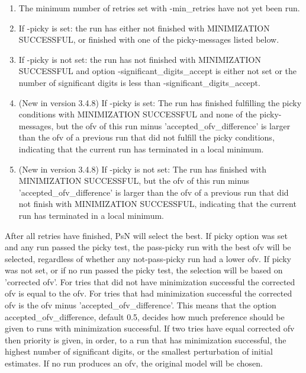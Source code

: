 \documentclass[a4paper,12pt]{article}
\begin{document}
\begin{enumerate}
\item The minimum number of retries set with -min\_retries have not yet been run.
\item If -picky is set: the run has either not finished with MINIMIZATION SUCCESSFUL, or finished with one of the picky-messages listed below.
\item If -picky is not set: the run has not finished with MINIMIZATION SUCCESSFUL and option -significant\_digits\_accept is either not set or the number of significant digits is less than -significant\_digits\_accept.
\item (New in version 3.4.8) If -picky is set: The run has finished fulfilling the picky conditions with MINIMIZATION SUCCESSFUL and none of the picky-messages, but the ofv of this run minus 'accepted\_ofv\_difference' is larger than the ofv of a previous run that did not fulfill the picky conditions, indicating that the current run has terminated in a local minimum.
\item (New in version 3.4.8) If -picky is not set: The run has finished with MINIMIZATION SUCCESSFUL, but the ofv of this run minus 'accepted\_ofv\_difference' is larger than the ofv of a previous run that did not finish with MINIMIZATION SUCCESSFUL, indicating that the current run has terminated in a local minimum.
\end{enumerate}

After all retries have finished, PsN will select the best. If picky option was set and any run passed the picky test, the pass-picky run with the best ofv will be selected, regardless of whether any not-pass-picky run had a lower ofv. If picky was not set, or if no run passed the picky test, the selection will be based on 'corrected ofv'. For tries that did not have minimization successful the corrected ofv is equal to the ofv. For tries that had minimization successful the corrected ofv is the ofv minus 'accepted\_ofv\_difference'. This means that the option accepted\_ofv\_difference, default 0.5, decides how much preference should be given to runs with minimization successful. If two tries have equal corrected ofv then priority is given, in order, to a run that has minimization successful, the highest number of significant digits, or the smallest perturbation of initial estimates. If no run produces an ofv, the original model will be chosen.
\end{document}
